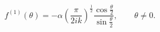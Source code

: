 \begin{equation}
f^{\left( 1\right) }(\theta )=-\alpha \left( \frac{\pi }{2ik}\right) ^{\frac{1%
}{2}}\frac{\cos \frac{\theta }{2}}{\sin \frac{\theta }{2}},\qquad \theta
\neq 0.
\end{equation}

